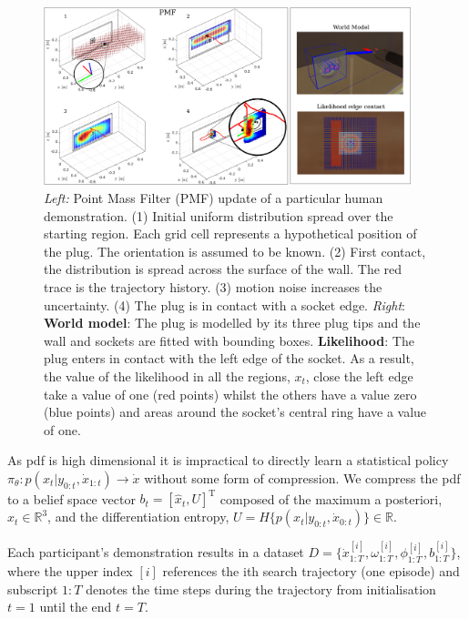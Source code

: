 \documentclass[final,5p,times,twocolumn]{elsarticle}
\begin{document}
\begin{figure}
 \centering
   \includegraphics[width=0.95\textwidth]{./Figure/Figure2.pdf}
   \caption{\textit{Left:} Point Mass Filter (PMF) update of a particular human demonstration. (1) Initial uniform distribution spread over the starting 
   region. Each grid cell represents a hypothetical position of the plug. The orientation is assumed to be known. (2) First contact, the distribution 
   is spread across the surface of the wall. The red trace is the trajectory history. (3) motion noise increases the uncertainty. (4) The plug is in contact with a socket edge.
   \textit{Right}: \textbf{World model}: The plug is modelled by its three plug tips and the wall and sockets are fitted with bounding boxes.
   \textbf{Likelihood}: The plug enters in contact with the left edge of the socket. As a result, the value of the likelihood in all the regions, $x_t$, close the left edge take 
   a value of one (red points)  whilst the others have a value zero (blue points) and areas around the socket's central 
   ring have a value of one. }
  \label{fig:PMF}
\end{figure}

As pdf is high dimensional it is impractical to directly learn a statistical 
policy ${\pi_{\theta} : p(x_t|y_{0:t},\dot{x}_{1:t}) \rightarrow \dot{x} }$ without some form of compression. 
We compress the pdf to a belief space vector $b_t = [\hat{x}_t,U]^{\mathrm{T}}$ composed of the maximum a posteriori, 
$\hat{x}_t \in \mathbb{R}^3$, and the differentiation entropy, $U = H\{p(x_t|y_{0:t},\dot{x}_{0:t})\} \in \mathbb{R}$.

Each participant's demonstration results in a dataset ${D=\{\dot{x}^{[i]}_{1:T},\omega^{[i]}_{1:T},\phi^{[i]}_{1:T},b^{[i]}_{1:T}\}}$, 
where the upper index $[i]$ references the ith search trajectory (one episode) and 
subscript $1:T$ denotes the time steps during the trajectory from initialisation $t=1$ until the end $t=T$. 
\end{document}
